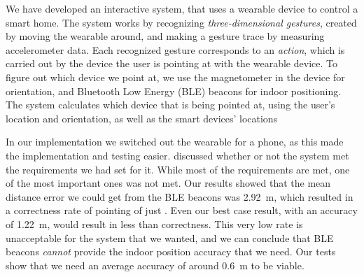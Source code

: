 We have developed an interactive system, 
that uses a wearable device to control a smart home. 
The system works by recognizing \emph{three-dimensional gestures}, 
created by moving the wearable around, 
and making a gesture trace by measuring accelerometer data. 
Each recognized gesture corresponds to an \emph{action}, 
which is carried out by the device the user is pointing at with the wearable device. 
To figure out which device we point at, 
we use the magnetometer in the device for orientation, 
and Bluetooth Low Energy (BLE) beacons for indoor positioning. 
The system calculates which device that is being pointed at, 
using the user's location and orientation, 
as well as the smart devices' locations 

In our implementation we switched out the wearable for a phone, 
as this made the implementation and testing easier. 
 discussed whether or not the system met the requirements we had set for it. 
While most of the requirements are met, 
one of the most important ones was not met. 
Our results showed that the mean distance error we could get from the BLE beacons was \SI{2.92}{\meter},
which resulted in a correctness rate of pointing of just . 
Even our best case result, with an accuracy of \SI{1.22}{\meter},
would result in less than  correctness.
This very low rate is unacceptable for the system that we wanted, 
and we can conclude that BLE beacons \emph{cannot} provide the indoor position accuracy that we need. 
Our tests show that we need an average accuracy of around \SI{0.6}{\meter} to be viable. 
